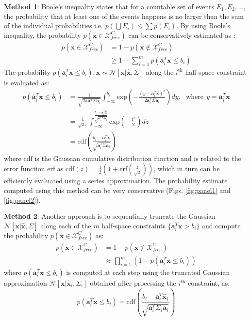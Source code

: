 \documentclass[letterpaper]{article}
\begin{document}
{\bf{Method 1}}: Boole's inequality states that for a countable set of events $E_1, E_2, \ldots$, the probability that at least one of the events happens is no larger than the sum of the individual probabilities i.e. $p(\bigcup E_i) \leq \sum p(E_i)$. By using Boole's inequality, the probability $p(\mathbf{x} \in \mathcal{X}_{free}^{C})$ can be conservatively estimated as \cite{Vitus11}:
\begin{align*}
p(\mathbf{x} \in \mathcal{X}_{free}^{C}) &= 1 - p(\mathbf{x} \not \in \mathcal{X}_{free}^{C})\\
&\geq 1 - \sum\limits_{i=1}^{m}p(\mathbf{a}_{i}^T \mathbf{x} \leq b_{i})
\end{align*}
The probability $p(\mathbf{a}_{i}^T \mathbf{x} \leq b_i), \mathbf{x} \sim \mathcal{N}[\mathbf{x}|\hat{\mathbf{x}}, \Sigma]$ along the $i^\mathrm{th}$ half-space constraint is evaluated as:
\begin{align*}
p(\mathbf{a}_{i}^T \mathbf{x} \leq b_i) &= 
\frac{1}{\sqrt{2 \pi \mathbf{a}_i^T \Sigma \mathbf{a}_i}} \int_{-\infty}^{b_i} \mathrm{exp}(-\frac{(y - \mathbf{a}_i^T\hat{\mathbf{x}})^2}{2\mathbf{a}_i^T\Sigma\mathbf{a}_i})dy, ~~~ \mathrm{where} ~~ y = \mathbf{a}_i^T\mathbf{x}\\
&=\frac{1}{\sqrt{2 \pi}} \int_{-\infty}^{\frac{b_i - \mathbf{a}_i^T\hat{\mathbf{x}}}{\sqrt{\mathbf{a}_i^T\Sigma\mathbf{a}_i}}}\mathrm{exp}(-\frac{z^{2}}{2})dz\\
&=\mathrm{cdf}(\frac{b_i - \mathbf{a}_i^T\hat{\mathbf{x}}}{\sqrt{\mathbf{a}_i^T\Sigma\mathbf{a}_i}})
\end{align*}
where cdf is the Gaussian cumulative distribution function and is related to the error function erf as $\mathrm{cdf}(z) = \frac{1}{2}(1 + \mathrm{erf}(\frac{z}{\sqrt{2}}))$, which in turn can be efficiently evaluated using a series approximation. The probability estimate computed using this method can be very conservative (Figs. \ref{fig:panel1} and \ref{fig:panel2}).

{\bf{Method 2}}: Another approach is to sequentially truncate the Gaussian $\mathcal{N}[\mathbf{x}|\hat{\mathbf{x}}, \Sigma]$ along each of the $m$ half-space constraints $\{\mathbf{a}_{i}^T \mathbf{x} > b_{i}\}$ and compute the probability $p(\mathbf{x} \in \mathcal{X}_{free}^{C})$ as:
\begin{align*}
p(\mathbf{x} \in \mathcal{X}_{free}^{C}) &= 1 - p(\mathbf{x} \not \in \mathcal{X}_{free}^{C})\\
&\approx \prod\limits_{i=1}^{m}(1 - p(\mathbf{a}_{i}^T \mathbf{x} \leq b_{i}))
\end{align*}
where $p(\mathbf{a}_{i}^T \mathbf{x} \leq b_{i})$ is computed at each step using the truncated Gaussian approximation $\mathcal{N}[\mathbf{x}|\hat{\mathbf{x}}_{i}, \Sigma_{i}]$ obtained after processing the $i^{\mathrm{th}}$ constraint, as:
\begin{equation*}
p(\mathbf{a}_{i}^T \mathbf{x} \leq b_{i})=\mathrm{cdf}(\frac{b_i - \mathbf{a}_i^T\hat{\mathbf{x}}_{i}}{\sqrt{\mathbf{a}_i^T\Sigma_i\mathbf{a}_i}})
\end{equation*}
\end{document}

